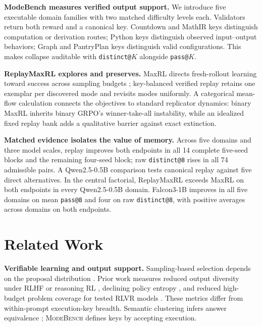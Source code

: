 \documentclass{article}
\newcommand{\1}{\mathbf 1}
\newcommand{\mb}{\textsc{ModeBench}}
\theoremstyle{remark}
\theoremstyle{definition}
\theoremstyle{plain}
\begin{document}
\begin{list}{\textbullet}{%
  \setlength{\leftmargin}{0pt}%
  \setlength{\labelwidth}{0pt}%
  \setlength{\labelsep}{0.65em}%
  \setlength{\itemindent}{0pt}%
  \setlength{\listparindent}{0pt}%
  \setlength{\parsep}{0pt}%
  \setlength{\topsep}{0.35em}%
  \setlength{\itemsep}{0.35em}}
  \item \textbf{ModeBench measures verified output support.} We introduce
  five executable domain families with two matched difficulty levels each.
  Validators return both reward and a canonical key. Countdown and MathIR keys
  distinguish computation or derivation routes; Python keys distinguish
  observed input--output behaviors; Graph and PantryPlan keys distinguish valid
  configurations. This makes collapse auditable with \texttt{distinct@}$K$
  alongside \texttt{pass@}$K$.

  \item \textbf{ReplayMaxRL explores and preserves.} MaxRL directs fresh-rollout
  learning toward success across sampling budgets \citep{tajwar2026maxrl};
  key-balanced verified replay retains one exemplar per discovered mode and
  revisits modes uniformly. A categorical mean-flow calculation connects the
  objectives to standard replicator dynamics: binary MaxRL inherits binary
  GRPO's winner-take-all instability, while an idealized fixed replay bank adds
  a qualitative barrier against exact extinction.

  \item \textbf{Matched evidence isolates the value of memory.} Across five
  domains and three model scales, replay improves both endpoints in all 14
  complete five-seed blocks and the remaining four-seed block; raw
  \texttt{distinct@8} rises in all 74 admissible pairs. A Qwen2.5-0.5B
  comparison tests canonical replay against five direct alternatives.
  In the central factorial, ReplayMaxRL exceeds MaxRL on both endpoints in
  every Qwen2.5-0.5B domain. Falcon3-1B improves in all five domains on mean
  \texttt{pass@8} and four on raw \texttt{distinct@8}, with positive averages
  across domains on both endpoints.
\end{list}

\section{Related Work}
\label{sec:related}

\noindent\textbf{Verifiable learning and output support.}
Sampling-based selection depends on the proposal distribution
\citep{brown2024monkeys,snell2024testtime}. Prior work measures reduced output
diversity under RLHF or reasoning RL \citep{kirk2024understanding,dang2025diversity},
declining policy entropy \citep{cui2025entropy}, and reduced high-budget problem
coverage for tested RLVR models \citep{yue2025rlvrlimit}. These metrics differ from
within-prompt execution-key breadth. Semantic clustering infers answer
equivalence \citep{farquhar2024detecting}; \mb{} defines keys by accepting execution.
\end{document}
